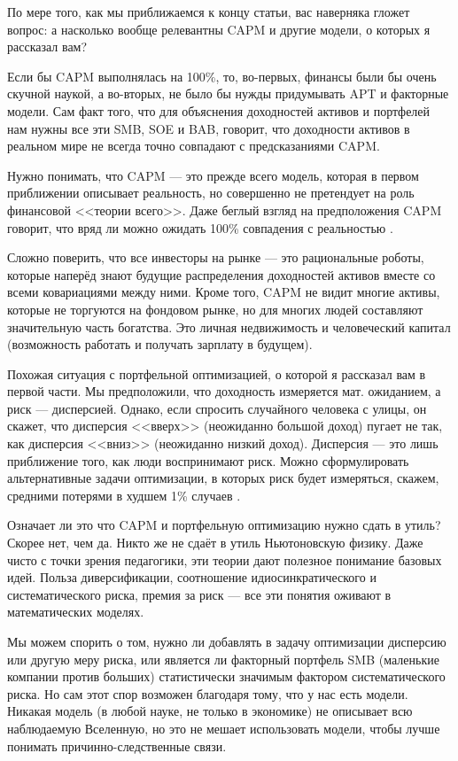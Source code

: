 По мере того, как мы приближаемся к концу статьи, вас наверняка гложет вопрос: 
а насколько вообще релевантны CAPM и другие модели, о которых я рассказал вам?

Если бы CAPM выполнялась на 100\%, то, во-первых, финансы были бы очень скучной
наукой, а во-вторых, не было бы нужды придумывать APT и факторные модели. Сам 
факт того, что для объяснения доходностей активов и портфелей нам нужны все эти 
SMB, SOE и BAB, говорит, что доходности активов в реальном мире не всегда точно 
совпадают с предсказаниями CAPM.

Нужно понимать, что CAPM --- это прежде всего модель, которая в первом 
приближении описывает реальность, но совершенно не претендует на роль 
финансовой <<теории всего>>. Даже беглый взгляд на предположения CAPM говорит, 
что вряд ли можно ожидать 100\% совпадения с реальностью
\cite[ch.~14.2]{welch}.

Сложно поверить, что все инвесторы на рынке --- это рациональные роботы, которые 
наперёд знают будущие распределения доходностей активов вместе со всеми 
ковариациями между ними. Кроме того, CAPM не видит многие активы, которые
не торгуются на фондовом рынке, но для многих людей составляют значительную 
часть богатства. Это личная недвижимость и человеческий капитал (возможность 
работать и получать зарплату в будущем).

Похожая ситуация с портфельной оптимизацией, о которой я рассказал вам в первой 
части. Мы предположили, что доходность измеряется мат. ожиданием, а риск --- 
дисперсией. Однако, если спросить случайного человека с улицы, он скажет, что 
дисперсия <<вверх>> (неожиданно большой доход) пугает не так, как дисперсия 
<<вниз>> (неожиданно низкий доход). Дисперсия --- это лишь приближение того, 
как люди воспринимают риск. Можно сформулировать альтернативные задачи 
оптимизации, в которых риск будет измеряться, скажем, средними потерями в 
худшем 1\% случаев \cite{krokhmal2002portfolio}.

Означает ли это что CAPM и портфельную оптимизацию нужно сдать в утиль? Скорее 
нет, чем да. Никто же не сдаёт в утиль Ньютоновскую физику. Даже чисто с точки
зрения педагогики, эти теории дают полезное понимание базовых идей. Польза 
диверсификации, соотношение идиосинкратического и систематического риска, 
премия за риск --- все эти понятия оживают в математических моделях.

Мы можем спорить о том, нужно ли добавлять в задачу оптимизации дисперсию или 
другую меру риска, или является ли факторный портфель SMB (маленькие компании 
против больших) статистически значимым фактором систематического риска. Но сам 
этот спор возможен благодаря тому, что у нас есть модели. Никакая модель (в 
любой науке, не только в экономике) не описывает всю наблюдаемую Вселенную, но 
это не мешает использовать модели, чтобы лучше понимать причинно-следственные 
связи.

